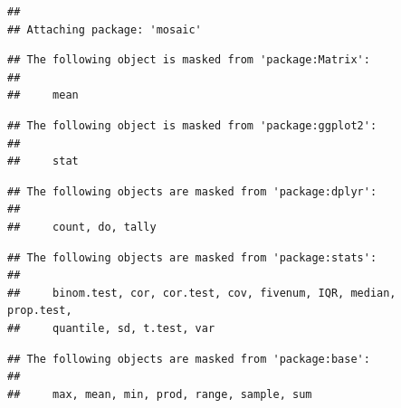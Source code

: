 \documentclass[
]{book}
\newenvironment{Shaded}{\begin{snugshade}}{\end{snugshade}}
\newcommand{\CommentTok}[1]{\textcolor[rgb]{0.56,0.35,0.01}{\textit{#1}}}
\newcommand{\DataTypeTok}[1]{\textcolor[rgb]{0.13,0.29,0.53}{#1}}
\newcommand{\DecValTok}[1]{\textcolor[rgb]{0.00,0.00,0.81}{#1}}
\newcommand{\KeywordTok}[1]{\textcolor[rgb]{0.13,0.29,0.53}{\textbf{#1}}}
\newcommand{\NormalTok}[1]{#1}
\newcommand{\OperatorTok}[1]{\textcolor[rgb]{0.81,0.36,0.00}{\textbf{#1}}}
\newcommand{\OtherTok}[1]{\textcolor[rgb]{0.56,0.35,0.01}{#1}}
\newcommand{\StringTok}[1]{\textcolor[rgb]{0.31,0.60,0.02}{#1}}
\begin{document}
\begin{verbatim}
## 
## Attaching package: 'mosaic'
\end{verbatim}

\begin{verbatim}
## The following object is masked from 'package:Matrix':
## 
##     mean
\end{verbatim}

\begin{verbatim}
## The following object is masked from 'package:ggplot2':
## 
##     stat
\end{verbatim}

\begin{verbatim}
## The following objects are masked from 'package:dplyr':
## 
##     count, do, tally
\end{verbatim}

\begin{verbatim}
## The following objects are masked from 'package:stats':
## 
##     binom.test, cor, cor.test, cov, fivenum, IQR, median, prop.test,
##     quantile, sd, t.test, var
\end{verbatim}

\begin{verbatim}
## The following objects are masked from 'package:base':
## 
##     max, mean, min, prod, range, sample, sum
\end{verbatim}

\begin{Shaded}
\end{Shaded}
\end{document}
